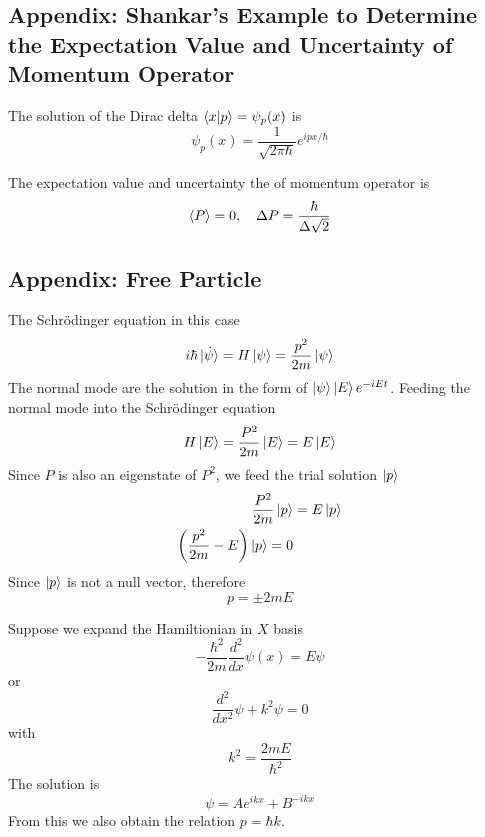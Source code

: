 \documentclass[../../../main.tex]{subfiles}
\begin{document}
\subsection{Appendix: Shankar's Example to Determine the Expectation Value and Uncertainty of Momentum Operator}
The solution of the Dirac delta $\braket{x|p}=\psi_p(x)$ is 
\begin{equation*}
    \psi_p(x)=\frac{1 }{\sqrt{2\pi \hbar}}e^{ipx/\hbar} 
\end{equation*}

The expectation value and uncertainty the of momentum operator is
\begin{equation*}
    \braket{P}=0,\quad\Delta P=\frac{\hbar}{\Delta\sqrt{2}}
\end{equation*}

\subsection{Appendix: Free Particle}
The Schrödinger equation in this case 
\begin{equation*}
    i \hbar \ket{\dot{\psi}}=H \ket{\psi}=\frac{p^2 }{2m }\ket{\psi}
\end{equation*}
The normal mode are the solution in the form of $\ket{\psi }\ket{E }e^{-iE t}$.
Feeding the normal mode into the Schrödinger equation
\begin{equation*}
    H \ket{E}=\frac{P^2 }{2m }\ket{E}=E \ket{E}
\end{equation*}
Since $P$ is also an eigenstate of $P^2 $, we feed the trial solution $\ket{p}$
\begin{align*}
    \frac{P^2 }{2m }\ket{p }&=  E \ket{p }\\
    \left( \frac{p^2 }{2m }-E  \right) \ket{p }=0
\end{align*}
Since $\ket{p}$ is not a null vector, therefore 
\begin{equation*}
    p=\pm 2mE
\end{equation*}

Suppose we expand the Hamiltionian in $X$ basis
\begin{equation*}
    -\frac{\hbar^2 }{2m }\frac{d^2 }{dx } \psi(x)=E\psi
\end{equation*}
or 
\begin{equation*}
    \frac{d^2 }{dx^2}\psi+k^2\psi=0
\end{equation*}
with 
\begin{equation*}
    k^2=\frac{2mE }{\hbar^2}
\end{equation*}
The solution is 
\begin{equation*}
    \psi=Ae^{ikx}+B^{-ikx}
\end{equation*}
From this we also obtain the relation $p=\hbar k$.
\end{document}
